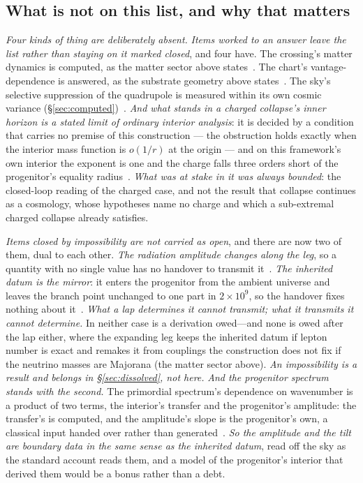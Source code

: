 \documentclass[11pt,a4paper]{article}
\theoremstyle{plain}
\theoremstyle{definition}
\begin{document}
\subsection{What is not on this list, and why that matters}

\emph{Four kinds of thing are deliberately absent.} \emph{Items worked to an answer leave the list rather
than staying on it marked closed}, and four have. The crossing's matter dynamics is computed, as the matter
sector above states~\cite{JanzenCosmogenesis}. The chart's vantage-dependence is answered, as the substrate
geometry above states~\cite{JanzenCRframework}. The sky's selective suppression of the quadrupole is measured
within its own cosmic variance (\S\ref{sec:computed})~\cite{JanzenCRcosmology}. \emph{And what stands in a
charged collapse's inner horizon is a stated limit of ordinary interior analysis}: it is decided by a condition
that carries no premise of this construction --- the obstruction holds exactly when the interior mass function
is $o(1/r)$ at the origin --- and on this framework's own interior the exponent is one and the charge falls
three orders short of the progenitor's equality radius~\cite{JanzenSlicing}. \emph{What was at stake in it was
always bounded}: the closed-loop reading of the charged case, and not the result that collapse continues as a
cosmology, whose hypotheses name no charge and which a sub-extremal charged collapse already satisfies.

\emph{Items closed by impossibility are not carried as
open}, and there are now two of them, dual to each other. \emph{The radiation amplitude changes along the leg}, so a
quantity with no single value has no handover to transmit it~\cite{JanzenGeometricCore}. \emph{The inherited
datum is the mirror}: it enters the progenitor from the ambient universe and leaves the branch point
unchanged to one part in $2\times10^{9}$, so the handover fixes nothing about
it~\cite{JanzenCosmogenesis}. \emph{What a lap determines it cannot transmit; what it transmits it cannot
determine.} In neither case is a derivation owed---and none is owed after the lap either, where the expanding
leg keeps the inherited datum if lepton number is exact and remakes it from couplings the construction does not fix
if the neutrino masses are Majorana (the matter sector above). \emph{An impossibility is a result and belongs in
\S\ref{sec:dissolved}, not here.} \emph{And the progenitor spectrum stands with the second.} The primordial
spectrum's dependence on wavenumber is a product of two terms, the interior's transfer and the progenitor's
amplitude: the transfer's is computed, and the amplitude's slope is the progenitor's own, a classical input
handed over rather than generated~\cite{JanzenCRcosmology,JanzenCRframework}. \emph{So the amplitude and the tilt are boundary
data in the same sense as the inherited datum}, read off the sky as the standard account reads them, and a
model of the progenitor's interior that derived them would be a bonus rather than a debt.
\end{document}
